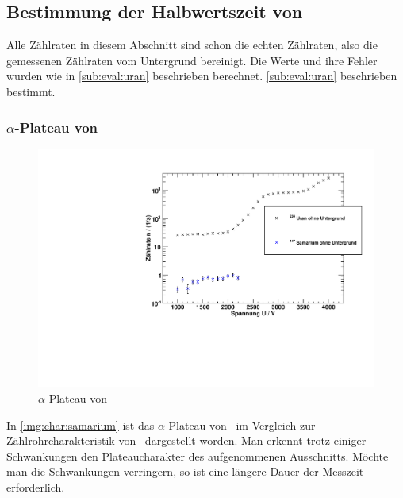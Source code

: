\subsection{Bestimmung der Halbwertszeit von \samarium}
Alle Zählraten in diesem Abschnitt sind schon die echten Zählraten, also die gemessenen Zählraten vom Untergrund bereinigt. 
Die Werte und ihre Fehler wurden wie in \ref{sub:eval:uran} beschrieben berechnet.
\ref{sub:eval:uran} beschrieben bestimmt.
\subsubsection{$\alpha$-Plateau von \samarium}
\begin{figure}[H]
\begin{center}
  \includegraphics[width=15cm]{../img/Samarium147_Charakteristik.pdf}
  \caption[$\alpha$-Plateau mit \samarium]{$\alpha$-Plateau von \samarium}
  \label{img:char:samarium}
\end{center}
\end{figure}
In \autoref{img:char:samarium} ist das $\alpha$-Plateau von \samarium\, im Vergleich zur Zählrohrcharakteristik von \uran\, dargestellt worden. 
Man erkennt trotz einiger Schwankungen den Plateaucharakter des aufgenommenen Ausschnitts. Möchte man die Schwankungen verringern, so ist eine 
längere Dauer der Messzeit erforderlich.

